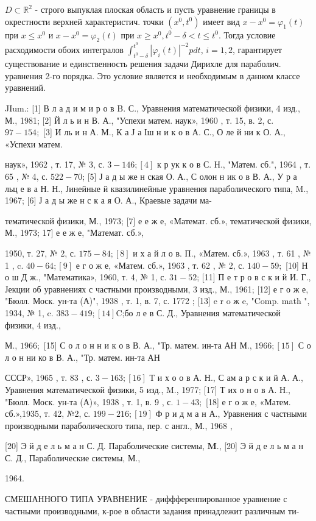 \documentclass[10pt]{article}
\begin{document}
$D \subset \mathbb{R}^{2}$ - строго выпуклая плоская область и пусть уравнение границы в окрестности верхней характеристич. точки $\left(x^{0}, t^{0}\right)$ имеет вид $x-x^{0}=\varphi_{1}(t)$ при $x \leqslant x^{0}$ и $x-x^{0}=\varphi_{2}(t)$ при $x \geqslant x^{0}, t^{0}-\delta<t \leqslant t^{0}$. Тогда условие расходимости обоих интегралов $\int_{t^{0}-\delta}^{t^{0}}\left|\varphi_{i}(t)\right|^{-2} p d t$, $i=1,2$, гарантирует существование и единственность решения задачи Дирихле для параболич. уравнения 2-го порядка. Это условие является и необходимым в данном классе уравнений.



JIum.: [1] В л а д и м и р о в B. С., Уравнения математической физики, 4 изд., М., 1981; [2] Й л ь и н В. А., "Успехи матем. наук», 1960 , т. 15, в. 2, с. $97-154 ;$ [3] И ль и н А. М., К а Ј а Іш н и к о в А. С., О ле й ни к О. А., «Успехи матем.

наук», 1962 , т. 17, № 3, с. $3-146 ;[4]$ к р ук к о в С. Н., "Матем. сб.", 1964 , т. 65 , № 4, с. $522-70$; [5] Ј а д ы же н ская О. А., С олон н ик о в В. А., У р а льц е в а Н. Н., Јинейные й квазилинейные уравнения параболического типа, M., 1967; [6] Ј а д ы же н с к а я О. А., Краевые задачи ма-

тематической физики, М., 1973; [7] е е ж е, «Математ. сб.», тематической физики, М., 1973; 17] е е ж е, "Математ. сб.»,

1950, т. 27, № 2, с. $175-84 ;[8]$ и х а й л о в. П., «Матем. сб.», 1963 , т. 61 , № 1 , c. $40-64 ;[9]$ е г о ж е, «Матем. сб.», 1963 , т. 62 , № 2, с. $140-59 ;$ [10] Н о ш Д ж., "Математика», 1960, т. 4, № 1, с. $31-52$; [11] П е т р о в с к и й И. Г., Јекции об уравнениях с частными производными, 3 изд., М., 1961; [12] е г о ж е, "Бюлл. Моск. ун-та (А)", 1938 , т. 1, в. 7, с. 1772 ; [13] e r o ж e, "Comp. math ", 1934, № 1, c. $383-419 ;[14] \mathrm{C}$;бо л е в С. Д., Уравнения математической физики, 4 изд.,

М., $1966 ;$ [15] С о л о н н и к о в В. А., "Тр. матем. ин-та АН М., $1966 ;[15]$ С о л о н ни ко в В. А., "Тр. матем. ин-та АН

СССР», 1965 , т. 83 , с. $3-163 ;[16]$ Т и х о о в А. Н., С ам а р с к и й А. А., Уравнения математической физики, 5 изд., M., 1977; [17] Т их о н о в А. Н., "Бюлл. Моск. ун-та (А)», 1938 , т. 1, в. 9 , с. $1-43 ;$ [18] е г о ж е, «Матем. сб.»,1935, т. 42, №2, с. $199-216 ;[19]$ Ф р и д м а н А., Уравнения с частными производными параболического типа, пер. с англ., М., 1968 ,

[20] $Э$ й д е л ь м а н С. Д. Параболические системы, $\mathbf{M}$., [20] Э й д е л ь м а н С. Д., Параболические системы, М.,

1964.



СМЕШАННОГО ТИПА УРАВНЕНИЕ - диффференпированное уравнение с частными производными, к-рое в области задания принадлежит различным ти-
\end{document}
